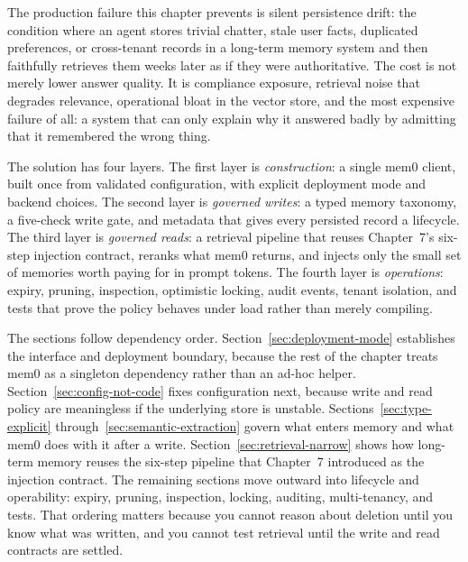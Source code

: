 

The production failure this chapter prevents is silent persistence drift: the
condition where an agent stores trivial chatter, stale user facts, duplicated
preferences, or cross-tenant records in a long-term memory system and then
faithfully retrieves them weeks later as if they were authoritative. The cost
is not merely lower answer quality. It is compliance exposure, retrieval noise
that degrades relevance, operational bloat in the vector store, and the most
expensive failure of all: a system that can only explain why it answered badly
by admitting that it remembered the wrong thing.

The solution has four layers. The first layer is \emph{construction}: a single
mem0 client, built once from validated configuration, with explicit deployment
mode and backend choices. The second layer is \emph{governed writes}: a typed
memory taxonomy, a five-check write gate, and metadata that gives every
persisted record a lifecycle. The third layer is \emph{governed reads}: a
retrieval pipeline that reuses Chapter~7's six-step injection contract,
reranks what mem0 returns, and injects only the small set of memories worth
paying for in prompt tokens. The fourth layer is \emph{operations}: expiry,
pruning, inspection, optimistic locking, audit events, tenant isolation, and
tests that prove the policy behaves under load rather than merely compiling.

The sections follow dependency order. Section~\ref{sec:deployment-mode}
establishes the interface and deployment boundary, because the rest of the
chapter treats mem0 as a singleton dependency rather than an ad-hoc helper.
Section~\ref{sec:config-not-code} fixes configuration next, because write and
read policy are meaningless if the underlying store is unstable.
Sections~\ref{sec:type-explicit} through~\ref{sec:semantic-extraction} govern
what enters memory and what mem0 does with it after a write.
Section~\ref{sec:retrieval-narrow} shows how long-term memory reuses the
six-step pipeline that Chapter~7 introduced as the injection contract.
The remaining sections move outward into lifecycle and operability: expiry,
pruning, inspection, locking, auditing, multi-tenancy, and tests. That
ordering matters because you cannot reason about deletion until you know what
was written, and you cannot test retrieval until the write and read contracts
are settled.

